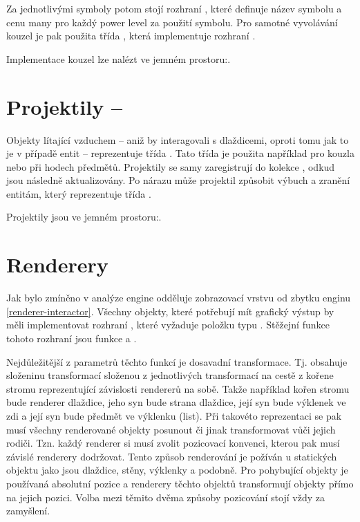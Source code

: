 Za jednotlivými symboly potom stojí rozhraní  , které definuje název symbolu a cenu many pro každý power level
za použití symbolu. Pro samotné vyvolávání kouzel je pak použita třída , která implementuje rozhraní
.

Implementace kouzel lze nalézt ve jemném prostoru:\newline {}.

\section{Projektily -- }
Objekty lítající vzduchem -- aniž by interagovali s dlaždicemi, oproti tomu jak to je v případě entit --  reprezentuje třída .
Tato třída je použita například pro kouzla nebo při hodech předmětů. Projektily se samy zaregistrují do kolekce ,
odkud jsou následně aktualizovány. Po nárazu může projektil způsobit výbuch a zranění entitám, který reprezentuje třída . 

Projektily jsou ve jemném prostoru:\newline {}.


\section{Renderery}
Jak bylo zmíněno v analýze engine odděluje zobrazovací vrstvu od zbytku enginu \vref{renderer-interactor}. Všechny objekty,
které potřebují mít grafický výstup by měli implementovat rozhraní , které vyžaduje položku typu . 
Stěžejní funkce tohoto rozhraní jsou funkce  a . 

Nejdůležitější z parametrů těchto funkcí je dosavadní transformace. Tj. obsahuje složeninu transformací složenou z jednotlivých
transformací na cestě z kořene stromu reprezentující závislosti rendererů na sobě. Takže například kořen stromu bude renderer
dlaždice, jeho syn bude strana dlaždice, její syn bude výklenek ve zdi a její syn bude předmět ve
výklenku (list). Při takovéto reprezentaci se pak musí všechny renderované objekty posunout či jinak transformovat vůči jejich rodiči.
Tzn. každý renderer si musí zvolit pozicovací konvenci, kterou pak musí závislé renderery dodržovat. Tento způsob renderování je požíván u statických objektu jako
jsou dlaždice, stěny, výklenky a podobně. Pro pohybující objekty je používaná absolutní pozice a renderery
těchto objektů transformují objekty přímo na jejich pozici. Volba mezi těmito dvěma způsoby pozicování stojí vždy za zamyšlení.

